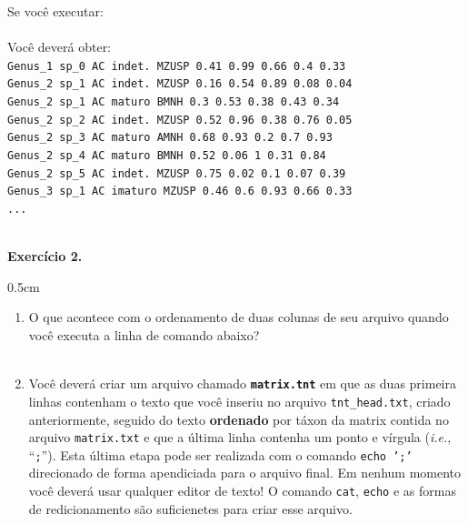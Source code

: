 \begin{refsection}
Se você executar:\\
\\

Você deverá obter:\\
\texttt{Genus\_1	sp\_0	AC	indet.	MZUSP	0.41	0.99	0.66	0.4	0.33}\\
\texttt{Genus\_2	sp\_1	AC	indet.	MZUSP	0.16	0.54	0.89	0.08	0.04}\\
\texttt{Genus\_2	sp\_1	AC	maturo	BMNH	0.3	0.53	0.38	0.43	0.34}\\
\texttt{Genus\_2	sp\_2	AC	indet.	MZUSP	0.52	0.96	0.38	0.76	0.05}\\
\texttt{Genus\_2	sp\_3	AC	maturo	AMNH	0.68	0.93	0.2	0.7	0.93}\\
\texttt{Genus\_2	sp\_4	AC	maturo	BMNH	0.52	0.06	1	0.31	0.84}\\
\texttt{Genus\_2	sp\_5	AC	indet.	MZUSP	0.75	0.02	0.1	0.07	0.39}\\
\texttt{Genus\_3	sp\_1	AC	imaturo	MZUSP	0.46	0.6	0.93	0.66	0.33}\\
\texttt{...}\\\

\begin{blackBlock}{\textbf{Exercício 2.}}\label{tut2:ex:2.\arabic{ex}}

\begin {myindentpar}{0.5cm}
\begin{enumerate}[\itshape i.]
 \item{O que acontece com o ordenamento de duas colunas de seu arquivo quando você executa a linha de comando abaixo?}\label{tut2:text:editors:texttools:sort:ex1}\\
\\

 \item{Você deverá criar um arquivo chamado \textbf{\texttt{matrix.tnt}} em que as duas primeira linhas contenham o texto que você inseriu no arquivo \texttt{tnt\_head.txt}, criado anteriormente, seguido do texto \textbf{ordenado} por táxon da matrix contida no arquivo \texttt{matrix.txt} e que a última linha contenha um ponto e vírgula (\textit{i.e.}, ``\texttt{;}''). Esta última etapa pode ser realizada com o comando \texttt{echo ';'} direcionado de forma apendiciada para o arquivo final. Em nenhum momento você deverá usar qualquer editor de texto! O comando \texttt{cat}, \texttt{echo} e as formas de redicionamento são suficienetes para criar esse arquivo. }\label{tut2:text:editors:texttools:sort:ex3}\\


\end{enumerate}
\end{myindentpar}
\end{blackBlock}
\end{refsection}
